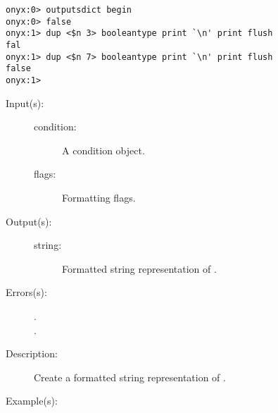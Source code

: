 \begin{description}
\begin{description}
\begin{verbatim}
onyx:0> outputsdict begin
onyx:0> false
onyx:1> dup <$n 3> booleantype print `\n' print flush
fal
onyx:1> dup <$n 7> booleantype print `\n' print flush
false
onyx:1>
		\end{verbatim}
	\end{description}
\label{outputsdict:conditiontype}
\item[{\onyxop{condition flags}{conditiontype}{string}}: ]
	\begin{description}\item[]
	\item[Input(s): ]
		\begin{description}\item[]
		\item[condition: ]
			A condition object.
		\item[flags: ]
			Formatting flags.
		\end{description}
	\item[Output(s): ]
		\begin{description}\item[]
		\item[string: ]
			Formatted string representation of .
		\end{description}
	\item[Errors(s): ]
		\begin{description}\item[]
		\item[.]
		\item[.]
		\end{description}
	\item[Description: ]
		Create a formatted string representation of .
	\item[Example(s): ]\begin{verbatim}


\end{verbatim}
\end{description}
\end{description}
